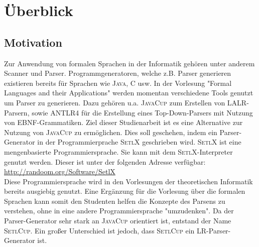 \section{Überblick}
\subsection{Motivation}
Zur Anwendung von formalen Sprachen in der Informatik gehören unter anderem Scanner und Parser\cite{Aho86}. 
Programmgeneratoren, welche z.B. Parser generieren existieren bereits für Sprachen wie \textsc{Java}\cite{javacup:2016}, \textsc{C}\cite{donnelly1990} usw.
In der Vorlesung "Formal Languages and their Applications"\cite{stroetmann:formallanguages} werden momentan verschiedene Tools genutzt um Parser zu generieren. Dazu gehören u.a. \textsc{JavaCup} zum Erstellen von LALR-Parsern, sowie \textsc{ANTLR4}\cite{parr:2012} für die Erstellung eines Top-Down-Parsers mit Nutzung von EBNF-Grammatiken.
Ziel dieser Studienarbeit ist es eine Alternative zur Nutzung von \textsc{JavaCup} zu ermöglichen. Dies soll geschehen, indem ein Parser-Generator in der Programmierprache \textsc{SetlX} geschrieben wird. \textsc{SetlX} ist eine mengenbasierte Programmiersprache. Sie kann mit dem \textsc{SetlX}-Interpreter genutzt werden. Dieser ist unter der folgenden Adresse verfügbar:\\
\href{http://randoom.org/Software/SetlX}{{http://randoom.org/Software/SetlX}}\\
Diese Programmiersprache wird in den Vorlesungen der theoretischen Informatik\cite{stroetmann:logic}\cite{stroetmann:algorithms} bereits ausgiebig genutzt. Eine Ergänzung für die Vorlesung über die formalen Sprachen kann somit den Studenten helfen die Konzepte des Parsens zu verstehen, ohne in eine andere Programmiersprache "umzudenken". Da der Parser-Generator sehr stark an \textsc{JavaCup} orientiert ist, entstand der Name \textsc{SetlCup}. Ein großer Unterschied ist jedoch, dass \textsc{SetlCup} ein LR-Parser-Generator ist.



